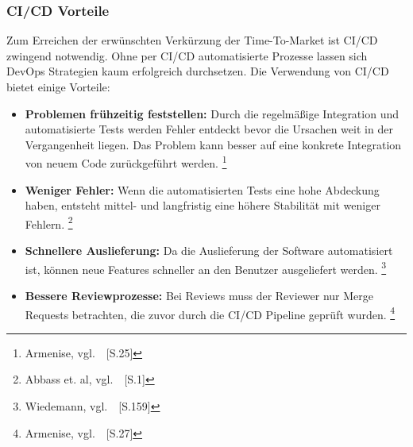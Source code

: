 \subsubsection{CI/CD Vorteile}\label{ci_cd_vorteile}

Zum Erreichen der erwünschten Verkürzung der Time-To-Market ist CI/CD zwingend notwendig.
Ohne per CI/CD automatisierte Prozesse lassen sich DevOps Strategien kaum erfolgreich durchsetzen.
Die Verwendung von CI/CD bietet einige Vorteile:

\begin{itemize}
    \item \textbf{Problemen frühzeitig feststellen:}
    Durch die regelmäßige Integration und automatisierte Tests werden Fehler entdeckt bevor die Ursachen weit in der Vergangenheit liegen.
    Das Problem kann besser auf eine konkrete Integration von neuem Code zurückgeführt werden.
    \footnote{Armenise, vgl.~\cite{Armenise2015}~[S.25]}

    \item \textbf{Weniger Fehler:}
    Wenn die automatisierten Tests eine hohe Abdeckung haben,
    entsteht mittel- und langfristig eine höhere Stabilität mit weniger Fehlern.
    \footnote{Abbass et. al, vgl.~\cite{Abbass2019}~[S.1]}

    \item \textbf{Schnellere Auslieferung:}
    Da die Auslieferung der Software automatisiert ist, können neue Features schneller an den Benutzer ausgeliefert werden.
    \footnote{Wiedemann, vgl.~\cite{Wiedemann2019}~[S.159]}

    \item \textbf{Bessere Reviewprozesse:}
    Bei Reviews muss der Reviewer nur Merge Requests betrachten, die zuvor durch die CI/CD Pipeline geprüft wurden.
    \footnote{Armenise, vgl.~\cite{Armenise2015}~[S.27]}
\end{itemize}
